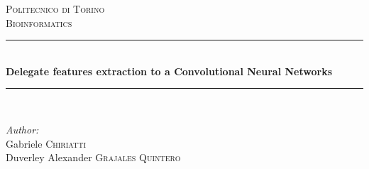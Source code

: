 \documentclass[12pt]{article} %
\begin{document}

\begin{titlepage}

\newcommand{\HRule}{\rule{\linewidth}{0.5mm}} %

\center %



\textsc{\LARGE Politecnico di Torino}\\[1cm] %
\textsc{\Large   Bioinformatics                           }\\[0.3cm] %

\HRule \\[0.5cm]
{ \huge  \bfseries Delegate features extraction to a Convolutional Neural Networks}\\[0.3cm] %
\HRule \\[0.5cm]

\begin{figure}[H] %
 \end{figure}

\begin{minipage}{0.8\textwidth}
\begin{flushleft} \large
\emph{Author:}\\
Gabriele \textsc{Chiriatti}\\
 Duverley Alexander \textsc{Grajales Quintero}\\
\end{flushleft}
\end{minipage}
~
\begin{minipage}{0.4\textwidth}
\begin{flushright} \large
\end{flushright}
\end{minipage}\\[1.9cm]


\end{titlepage}
\end{document}
